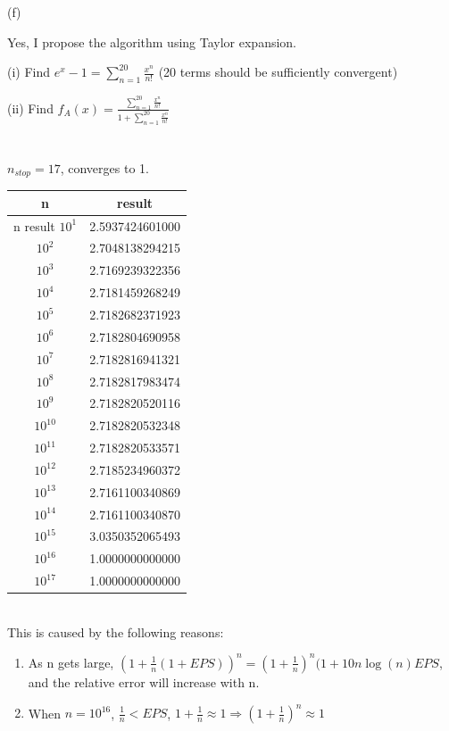 \documentclass[10pt]{article}
\begin{document}
(f)

Yes, I propose the algorithm using Taylor expansion.

(i) Find $e^x-1=\sum_{n=1}^{20}\frac{x^n}{n!}$ (20 terms should be sufficiently convergent)

(ii) Find $f_A(x)=\frac{\sum_{n=1}^{20}\frac{x^n}{n!}}{1+\sum_{n=1}^{20}\frac{x^n}{n!}}$

\section{}

$n_{stop}=17$, converges to 1.

\begin{tabular}{cc}
\hline
n & result\\
\hline
n	result
$10^1$ &	2.5937424601000\\
$10^2$ &	2.7048138294215\\
$10^3$ &	2.7169239322356\\
$10^4$ &	2.7181459268249\\
$10^5$ &	2.7182682371923\\
$10^6$ &	2.7182804690958\\
$10^7$ &	2.7182816941321\\
$10^8$ &	2.7182817983474\\
$10^9$ &	2.7182820520116\\
$10^10$ &	2.7182820532348\\
$10^11$ &	2.7182820533571\\
$10^12$ &	2.7185234960372\\
$10^13$ &	2.7161100340869\\
$10^14$ &	2.7161100340870\\
$10^15$ &	3.0350352065493\\
$10^16$ &	1.0000000000000\\
$10^17$ &	1.0000000000000\\
\hline
\end{tabular}\\

This is caused by the following reasons:

\begin{enumerate}
	\item As n gets large, $(1+\frac{1}{n}(1+EPS))^n=(1+\frac{1}{n})^n(1+10n\log(n)EPS$, and the relative error will increase with n.

	\item When $n=10^{16}$, $\frac{1}{n}<EPS$, $1+\frac{1}{n}\approx 1\Rightarrow(1+\frac{1}{n})^n\approx 1 $
\end{enumerate}
\end{document}

